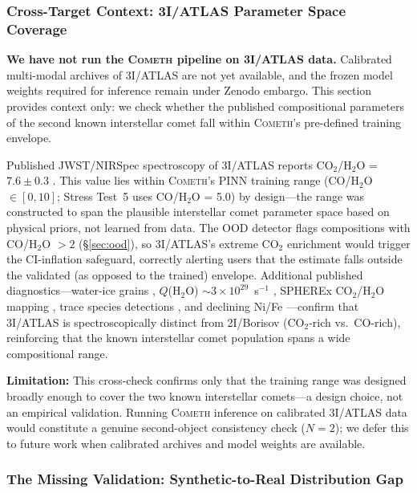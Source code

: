 \documentclass[usenatbib]{mnras}
\begin{document}
\subsubsection{Cross-Target Context: 3I/ATLAS Parameter Space Coverage}\label{sec:3i_atlas}

\textbf{We have not run the \textsc{Cometh} pipeline on 3I/ATLAS data.} Calibrated multi-modal archives of 3I/ATLAS are not yet available, and the frozen model weights required for inference remain under Zenodo embargo. This section provides context only: we check whether the published compositional parameters of the second known interstellar comet fall within \textsc{Cometh}'s pre-defined training envelope.

Published JWST/NIRSpec spectroscopy of 3I/ATLAS reports CO$_2$/H$_2$O = $7.6 \pm 0.3$ \citep{cordiner25}. This value lies within \textsc{Cometh}'s PINN training range (CO/H$_2$O $\in [0, 10]$; Stress Test~5 uses CO/H$_2$O = 5.0) by design---the range was constructed to span the plausible interstellar comet parameter space based on physical priors, not learned from data. The OOD detector flags compositions with CO/H$_2$O $> 2$ (\S\ref{sec:ood}), so 3I/ATLAS's extreme CO$_2$ enrichment would trigger the CI-inflation safeguard, correctly alerting users that the estimate falls outside the validated (as opposed to the trained) envelope. Additional published diagnostics---water-ice grains \citep{yang25}, $Q$(H$_2$O) $\sim 3\times10^{29}$~s$^{-1}$ \citep{combi26}, SPHEREx CO$_2$/H$_2$O mapping \citep{lisse26}, trace species detections \citep{biver26,roth26}, and declining Ni/Fe \citep{hutsemekers26}---confirm that 3I/ATLAS is spectroscopically distinct from 2I/Borisov (CO$_2$-rich vs.\ CO-rich), reinforcing that the known interstellar comet population spans a wide compositional range.

\textbf{Limitation:} This cross-check confirms only that the training range was designed broadly enough to cover the two known interstellar comets---a design choice, not an empirical validation. Running \textsc{Cometh} inference on calibrated 3I/ATLAS data would constitute a genuine second-object consistency check ($N=2$); we defer this to future work when calibrated archives and model weights are available.

\subsubsection{The Missing Validation: Synthetic-to-Real Distribution Gap}\label{sec:mmd_gap}
\end{document}
